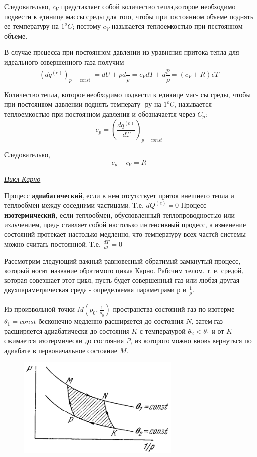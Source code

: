 Следовательно,  $c_V$ представляет собой количество тепла,которое необходимо подвести к единице массы среды для того, чтобы при постоянном объеме поднять ее температуру на $1^oC$;  поэтому $c_V$ называется теплоемкостью при постоянном объеме.

В случае процесса при постоянном давлении из уравнения притока тепла для идеального совершенного газа получим
$$ \left(d q^{(e)}\right)_{p=\text { const }}=d U+p d \frac{1}{\rho}=c_V d T+d \frac{p}{\rho}=\left(c_V+R\right) d T $$

Количество тепла, которое необходимо подвести к единице мас- сы среды, чтобы при постоянном давлении поднять температу- ру на $1^oC$, называется теплоемкостью при постоянном давлении и обозначается через $C_p$:
$$ c_p = \left( \frac{dq^{(e)}}{dT} \right)_{p=const} $$

Следовательно, $$ c_p - c_V = R $$


\begin{center}
	\textit{\underline{Цикл Карно}}
\end{center}

Процесс \textbf{адиабатический}, если в нем отсутствует приток внешнего тепла и теплообмен между соседними частицами. Т.е. $\displaystyle dQ^{(e)} = 0$
Процесс \textbf{изотермический}, если теплообмен, обусловленный теплопроводностью или излучением, пред- ставляет собой настолько интенсивный продесс, а изменение состояний протекает настолько медленно, что температуру всех частей системы можно считать постоянной. Т.е. $\displaystyle \frac{dT}{dt} = 0$

Рассмотрим следующий важный равновесный обратимый замкнутый процесс, который носит название обратимого цикла Карно. Рабочим телом, т. е. средой, которая совершает этот цикл, пусть будет совершенный газ или любая другая двухпараметрическая среда - определяемая параметрами р и $\frac{1}{\rho}$. 

Из произвольной точки $M (p_0, \frac{1}{\rho_0})$ пространства состояний газ по изотерме $\theta_1 = const$ бесконечно медленно расширяется до состояния $N$, затем газ расширяется адиабатически до состояния $K$ с  температурой $\theta_2 < \theta_1$ и от $K$ сжимается изотермически до состояния $P$, из которого можно вновь вернуться по адиабате в первоначальное состояние $M$.

\begin{figure}[H]
\includegraphics[width=0.7\textwidth]{10/carno.png}
\end{figure}


